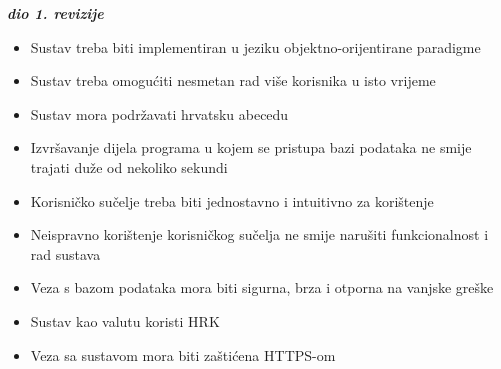 			\textbf{\textit{dio 1. revizije}}\\
			\begin{itemize}
				\item Sustav treba biti implementiran u jeziku objektno-orijentirane paradigme
				\item Sustav treba omogućiti nesmetan rad više korisnika u isto vrijeme
				\item Sustav mora podržavati hrvatsku abecedu
				\item Izvršavanje dijela programa u kojem se pristupa bazi podataka ne smije trajati duže od nekoliko sekundi
				\item Korisničko sučelje treba biti jednostavno i intuitivno za korištenje
				\item Neispravno korištenje korisničkog sučelja ne smije narušiti funkcionalnost i rad sustava
				\item Veza s bazom podataka mora biti sigurna, brza i otporna na vanjske greške
				\item Sustav kao valutu koristi HRK
				\item Veza sa sustavom mora biti zaštićena HTTPS-om
			\end{itemize}
			
			 
			 
			 
	